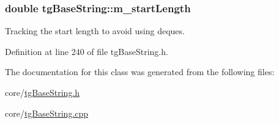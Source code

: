 \hypertarget{classtg_base_string_a14e96c33278197f084ee733b93123b0e}{
\subsubsection[{m\-\_\-start\-Length}]{\setlength{\rightskip}{0pt plus 5cm}double tg\-Base\-String\-::m\-\_\-start\-Length\hspace{0.3cm}{\ttfamily [protected]}}}\label{classtg_base_string_a14e96c33278197f084ee733b93123b0e}
Tracking the start length to avoid using deques. 

Definition at line 240 of file tg\-Base\-String.\-h.



The documentation for this class was generated from the following files\-:\begin{DoxyCompactItemize}
\item 
core/\hyperlink{tg_base_string_8h}{tg\-Base\-String.\-h}\item 
core/\hyperlink{tg_base_string_8cpp}{tg\-Base\-String.\-cpp}\end{DoxyCompactItemize}
